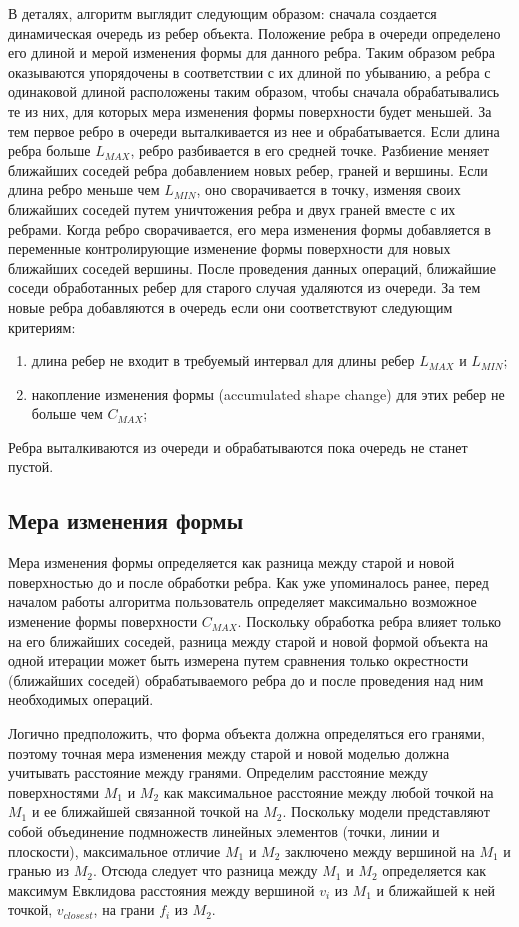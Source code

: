 \documentclass[14pt]{article}
\numberwithin{figure}{section}
\numberwithin{equation}{section}
\begin{document}
В деталях, алгоритм выглядит следующим образом: сначала создается динамическая очередь из ребер объекта. Положение ребра в очереди определено его длиной и мерой изменения формы для данного ребра. Таким образом ребра оказываются упорядочены в соответствии с их длиной по убыванию, а ребра с одинаковой длиной расположены таким образом, чтобы сначала обрабатывались те из них, для которых мера изменения формы поверхности будет меньшей. За тем первое ребро в очереди выталкивается из нее и обрабатывается. Если длина ребра больше $L_{MAX}$, ребро разбивается в его средней точке. Разбиение меняет ближайших соседей ребра добавлением новых ребер, граней и вершины. Если длина ребро меньше чем $L_{MIN}$, оно сворачивается в точку, изменяя своих ближайших соседей путем уничтожения ребра и двух граней вместе с их ребрами. Когда ребро сворачивается, его мера изменения формы добавляется в переменные контролирующие изменение формы поверхности для новых ближайших соседей вершины. После проведения данных операций, ближайшие соседи обработанных ребер для старого случая удаляются из очереди. За тем новые ребра добавляются в очередь если они соответствуют следующим критериям:

\begin{enumerate}
	\item
	длина ребер не входит в требуемый интервал для длины ребер $L_{MAX}$ и $L_{MIN}$;
	\item
	накопление изменения формы (accumulated shape change) для этих ребер не больше чем $C_{MAX}$;
\end{enumerate}

Ребра выталкиваются из очереди и обрабатываются пока очередь не станет пустой.

\subsection{Мера изменения формы}

Мера изменения формы определяется как разница между старой и новой поверхностью до и после обработки ребра. Как уже упоминалось ранее, перед началом работы алгоритма пользователь определяет максимально возможное изменение формы поверхности $C_{MAX}$. Поскольку обработка ребра влияет только на его ближайших соседей, разница между старой и новой формой объекта на одной итерации может быть измерена путем сравнения только окрестности (ближайших соседей) обрабатываемого ребра до и после проведения над ним необходимых операций.

Логично предположить, что форма объекта должна определяться его гранями, поэтому точная мера изменения между старой и новой моделью должна учитывать расстояние между гранями. Определим расстояние между поверхностями $M_1$ и $M_2$ как максимальное расстояние между любой точкой на $M_1$ и ее ближайшей связанной точкой на $M_2$. Поскольку модели представляют собой объединение подмножеств линейных элементов (точки, линии и плоскости), максимальное отличие $M_1$ и $M_2$ заключено между вершиной на $M_1$ и гранью из $M_2$. Отсюда следует что разница между $M_1$ и $M_2$ определяется как максимум Евклидова расстояния между вершиной $v_i$ из $M_1$ и ближайшей к ней точкой, $v_{closest}$, на грани $f_i$ из $M_2$.
\end{document}
